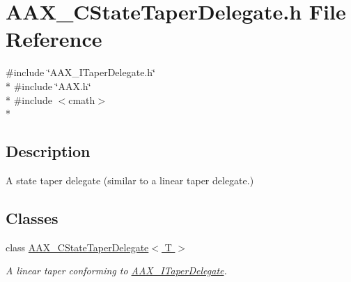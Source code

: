 \hypertarget{a00196}{}\section{A\+A\+X\+\_\+\+C\+State\+Taper\+Delegate.\+h File Reference}
\label{a00196}
{\ttfamily \#include \char`\"{}A\+A\+X\+\_\+\+I\+Taper\+Delegate.\+h\char`\"{}}\\*
{\ttfamily \#include \char`\"{}A\+A\+X.\+h\char`\"{}}\\*
{\ttfamily \#include $<$cmath$>$}\\*


\subsection{Description}
A state taper delegate (similar to a linear taper delegate.) 

\subsection*{Classes}
\begin{DoxyCompactItemize}
\item 
class \hyperlink{a00041}{A\+A\+X\+\_\+\+C\+State\+Taper\+Delegate$<$ T $>$}
\begin{DoxyCompactList}\small\item\em A linear taper conforming to \hyperlink{a00114}{A\+A\+X\+\_\+\+I\+Taper\+Delegate}. \end{DoxyCompactList}\end{DoxyCompactItemize}
